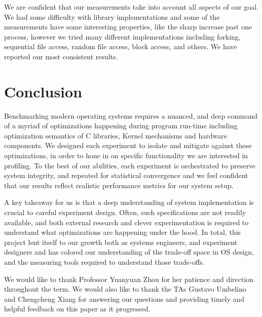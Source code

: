 \documentclass[sigconf]{acmart}
\begin{document}
We are confident that our measurements take into account all aspects of our goal. We had some difficulty with library implementations and some of the measurements have some interesting properties, like the sharp increase past one process, however we tried many different implementations including forking, sequential file access, random file access, block access, and others. We have reported our most consistent results.

\section{Conclusion}
Benchmarking modern operating systems requires a nuanced, and deep command of a myriad of optimizations happening during program run-time including optimization semantics of C libraries, Kernel mechanisms and hardware components.  We designed each experiment to isolate and mitigate against these optimizations, in order to hone in on specific functionality we are interested in profiling. To the best of our abilities, each experiment is orchestrated to preserve system integrity, and repeated for statistical convergence and we  feel confident that our results reflect realistic performance metrics for our system setup.

A key takeaway for us is that a deep understanding of system implementation is crucial to careful experiment design. Often, such specifications are not readily available, and both external research and clever experimentation is required to understand what optimizations are happening under the hood. In total, this project lent itself to our growth both as systems engineers, and  experiment designers and has colored our understanding of the trade-off space in OS design, and the measuring tools required to understand those trade-offs.

\begin{acks}
We would like to thank Professor Yuanyuan Zhou for her patience and direction throughout the term. We would also like to thank the TAs Gustavo Umbelino and Chengcheng Xiang for answering our questions and providing timely and helpful feedback on this paper as it progressed.  
\end{acks}



\end{document}
